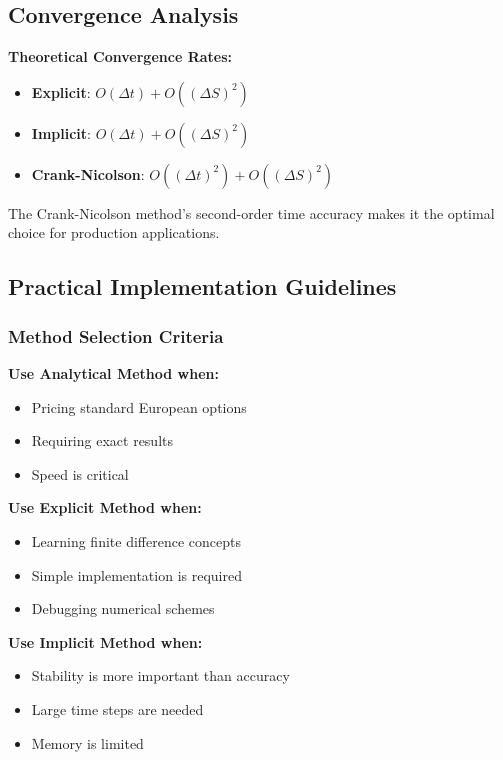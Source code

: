 \documentclass[12pt,a4paper]{article}
\numberwithin{algorithm}{subsection}
\begin{document}
\subsection{Convergence Analysis}

\textbf{Theoretical Convergence Rates:}
\begin{itemize}
\item \textbf{Explicit}: $O(\Delta t) + O((\Delta S)^2)$
\item \textbf{Implicit}: $O(\Delta t) + O((\Delta S)^2)$
\item \textbf{Crank-Nicolson}: $O((\Delta t)^2) + O((\Delta S)^2)$
\end{itemize}

The Crank-Nicolson method's second-order time accuracy makes it the optimal choice for production applications.

\subsection{Practical Implementation Guidelines}

\subsubsection{Method Selection Criteria}

\textbf{Use Analytical Method when:}
\begin{itemize}
\item Pricing standard European options
\item Requiring exact results
\item Speed is critical
\end{itemize}

\textbf{Use Explicit Method when:}
\begin{itemize}
\item Learning finite difference concepts
\item Simple implementation is required
\item Debugging numerical schemes
\end{itemize}

\textbf{Use Implicit Method when:}
\begin{itemize}
\item Stability is more important than accuracy
\item Large time steps are needed
\item Memory is limited
\end{itemize}
\end{document}
